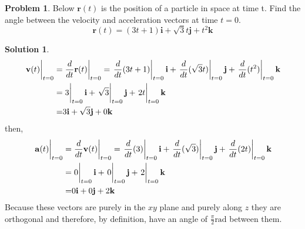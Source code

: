\documentclass[10pt]{article}
\theoremstyle{definition}
\newtheorem{problem}{Problem}
\newtheorem{soln}{Solution}
\begin{document}
\begin{problem} Below $\mathbf{r}(t)$ is the position of a particle in space at time t. Find the angle
between the velocity and acceleration vectors at time $t = 0$.
$$\mathbf{r}(t)=(3t+1)\mathbf{i}+\sqrt{3}t\mathbf{j}+t^2\mathbf{k}$$
\end{problem}
\begin{soln}
  \begin{align*}
    \eval{\mathbf{v}(t)}_{t=0}= & \eval{\frac{d}{dt}\mathbf{r}(t)}_{t=0}=\eval{\frac{d}{dt}(3t+1)}_{t=0}\mathbf{i}+\eval{\frac{d}{dt}(\sqrt{3}t)}_{t=0}\mathbf{j}+\eval{\frac{d}{dt}(t^2)}_{t=0}\mathbf{k} \\
    =                           & \eval{3}_{t=0}\mathbf{i}+\eval{\sqrt{3}}_{t=0}\mathbf{j}+\eval{2t}_{t=0}\mathbf{k}                                                                                      \\
    =                           & 3\mathbf{i}+\sqrt3\mathbf{j}+0\mathbf{k}
  \end{align*}
  then,
  \begin{align*}
    \eval{\mathbf{a}(t)}_{t=0}= & \eval{\frac{d}{dt}\mathbf{v}(t)}_{t=0}=\eval{\frac{d}{dt}(3)}_{t=0}\mathbf{i}+\eval{\frac{d}{dt}(\sqrt{3})}_{t=0}\mathbf{j}+\eval{\frac{d}{dt}(2t)}_{t=0}\mathbf{k} \\
    =                           & \eval{0}_{t=0}\mathbf{i}+\eval{0}_{t=0}\mathbf{j}+\eval{2}_{t=0}\mathbf{k}                                                                              \\
    =                           & 0\mathbf{i}+0\mathbf{j}+2\mathbf{k}
  \end{align*}
  Because these vectors are purely in the $xy$ plane and purely along $z$ they are orthogonal and therefore, by definition, have an angle
  of $\frac{\pi}{2}\unit{\radian}$ between them.
\end{soln}
\end{document}
